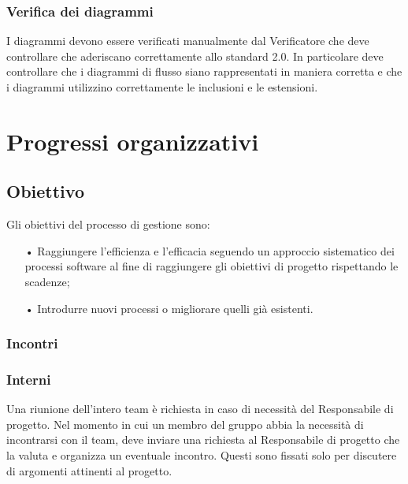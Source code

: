 \subsubsection{Verifica dei diagrammi}
I diagrammi devono essere verificati manualmente dal Verificatore che deve controllare che aderiscano correttamente allo standard 2.0. In particolare deve controllare che i diagrammi di flusso siano rappresentati in maniera corretta e che i diagrammi utilizzino correttamente le inclusioni e le estensioni.

\section{Progressi organizzativi}

\subsection{Obiettivo}
Gli obiettivi del processo di gestione sono:
\begin{itemize}
\item[•] Raggiungere l’efficienza e l’efficacia seguendo un approccio sistematico dei processi software al fine di raggiungere gli obiettivi di progetto rispettando le scadenze;
\item[•] Introdurre nuovi processi o migliorare quelli già esistenti.
\end{itemize}

\subsubsection{Incontri}

\subsubsection{Interni}
Una riunione dell'intero team è richiesta in caso di necessità del Responsabile di progetto. Nel momento in cui un membro del gruppo abbia la necessità di incontrarsi con il team, deve inviare una richiesta al Responsabile di progetto che la valuta e organizza un eventuale incontro. Questi sono fissati solo per discutere di argomenti attinenti al progetto.

